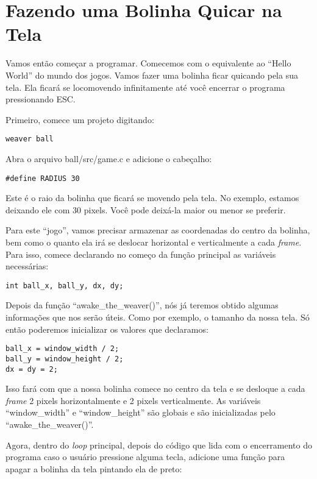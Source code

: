 \documentclass[11pt,a4paper]{book}
\begin{document}
\chapter{Fazendo uma Bolinha Quicar na Tela}

Vamos então começar a programar. Comecemos com o equivalente ao
``Hello World'' do mundo dos jogos. Vamos fazer uma bolinha ficar
quicando pela sua tela. Ela ficará se locomovendo infinitamente até
você encerrar o programa pressionando ESC.

Primeiro, comece um projeto digitando:

\begin{verbatim}
weaver ball
\end{verbatim}

Abra o arquivo ball/src/game.c e adicione o cabeçalho:

\begin{verbatim}
#define RADIUS 30
\end{verbatim}

Este é o raio da bolinha que ficará se movendo pela tela. No exemplo,
estamos deixando ele com 30 pixels. Você pode deixá-la maior ou menor
se preferir.

Para este ``jogo'', vamos precisar armazenar as coordenadas do centro
da bolinha, bem como o quanto ela irá se deslocar horizontal e
verticalmente a cada \textit{frame}. Para isso, comece declarando no
começo da função principal as variáveis necessárias:

\begin{verbatim}
int ball_x, ball_y, dx, dy;
\end{verbatim}

Depois da função ``awake\_the\_weaver()'', nós já teremos obtido
algumas informações que nos serão úteis. Como por exemplo, o tamanho
da nossa tela. Só então poderemos inicializar os valores que
declaramos:

\begin{verbatim}
ball_x = window_width / 2;
ball_y = window_height / 2;
dx = dy = 2;
\end{verbatim}

Isso fará com que a nossa bolinha comece no centro da tela e se
desloque a cada \textit{frame} 2 pixels horizontalmente e 2 pixels
verticalmente. As variáveis ``window\_width'' e ``window\_height'' são
globais e são inicializadas pelo \\``awake\_the\_weaver()''.

Agora, dentro do \textit{loop} principal, depois do código que lida
com o encerramento do programa caso o usuário pressione alguma tecla,
adicione uma função para apagar a bolinha da tela pintando ela de
preto:
\end{document}
